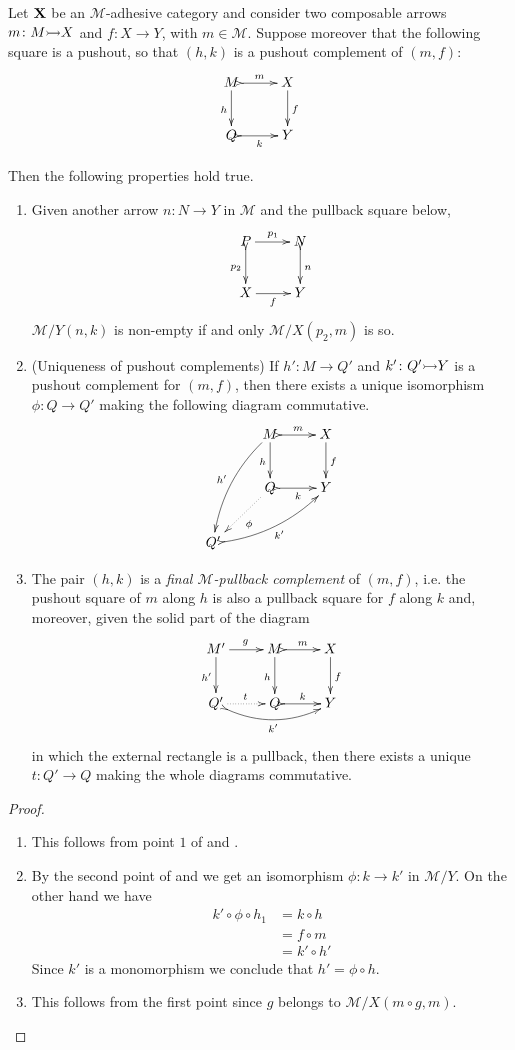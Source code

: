\begin{corollary}\label{lem:radj} Let $\textbf {\textup{X}}$ be an $\mathcal{M}$-adhesive category and consider two composable arrows $m\colon M \mto X$  and $f\colon X\to Y$, with $m\in \mathcal{M}$. Suppose moreover that the following square is a pushout, so that $(h,k)$ is a pushout complement of $(m,f)$:
	\[\xymatrix{M \ar@{>->}[r]^{m}\ar[d]_{h}& X \ar[d]^{f} \\Q\ar@{>->}[r]_{k}&Y}\]
	
Then the following properties hold true.
\begin{enumerate}
	\item  Given another arrow $n\colon N\to Y$ in $\mathcal{M}$ and the pullback square below,
	\[\xymatrix{P \ar[r]^{p_1} \ar@{>->}[d]_{p_2}& N \ar@{>->}[d]^{n}\\X \ar[r]_f&Y}\]
	$\mathcal{M}/Y(n, k)$ is non-empty  if and only $\mathcal{M}/X(p_2, m)$ is so.
	\item (Uniqueness of pushout complements) If $h'\colon M\to Q' $ and $k'\colon Q'\mto Y$ is a pushout complement for $(m,f)$, then there exists a unique isomorphism $\phi\colon Q\to Q'$ making the following diagram commutative.
	\[\xymatrix{&M \ar@{>->}[r]^{m} \ar[d]_{h} \ar@/_.3cm/[ddl]_{h'}& X \ar[d]^{f} \\ &Q \ar@{.>}[dl]^{\phi} \ar@{>->}[r]_{k} & Y \\ Q' \ar@{>->}@/_.3cm/[urr]_{k'}}\]
	\item The pair $(h,k)$ is a \emph{final $\mathcal{M}$-pullback complement} of $(m,f)$, i.e. the pushout square of $m$ along $h$ is also a pullback square for $f$ along $k$ and, moreover, given the solid part of the diagram
	\[\xymatrix{M' \ar[r]^{g}\ar[d]_{h'} & M \ar@{>->}[r]^{m}\ar[d]_{h}& X \ar[d]^{f}  \\  Q' \ar@{.>}[r]^{t} \ar@/_.4cm/@{>->}[rr]_{k'}&Q\ar@{>->}[r]^{k}&Y}\]
	in which the external rectangle is a pullback, then there exists a unique $t\colon Q'\to Q$ making the whole diagrams commutative.
\end{enumerate}
\end{corollary}
\begin{proof}
	\begin{enumerate}
		\item  This follows from point $1$ of  and .
		\item  By the second point  of  and  we get an isomorphism $\phi:k\to k'$ in $\mathcal{M}/Y$. On the other hand we have
		\begin{align*}
			k'\circ \phi \circ  h_1&=k\circ h\\&=f\circ m\\&= k'\circ h'
		\end{align*}
		Since $k'$ is a monomorphism we conclude that $h'=\phi\circ h$.
		\item  This follows from the first point since $g$ belongs to $\mathcal{M}/X(m\circ g, m)$. \qedhere 
	\end{enumerate}
\end{proof}

